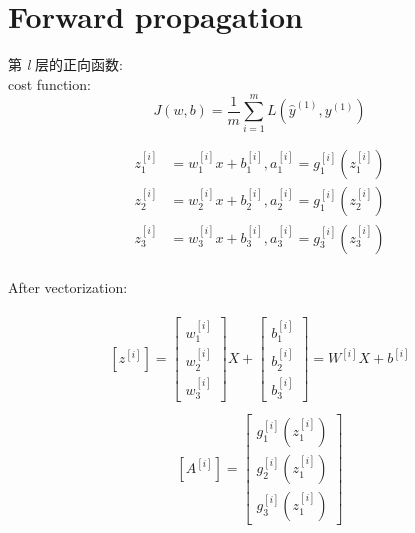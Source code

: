 \documentclass{article}
\begin{document}
\section{Forward propagation} %
\label{sec:forward_propagation}

第 \textit{ l }层的正向函数: \\
	cost function:
	\begin{equation}
	J(w,b) = \frac{1}{m} \sum_{i=1}^m L(\hat{y}^{(1) }, y^{(1)})
	\end{equation}

	\begin{equation}
	\begin{split}
	z_{1}^{[i]} &= w_{1}^{[i]}x + b_{1}^{[i]}  ,  a_{1}^{[i]}   = g_{1}^{[i]}(z_{1}^{[i]}) \\
	z_{2}^{[i]} &= w_{2}^{[i]}x + b_{2}^{[i]}  ,  a_{2}^{[i]}   = g_{1}^{[i]}(z_{2}^{[i]}) \\
	z_{3}^{[i]} &= w_{3}^{[i]}x + b_{3}^{[i]}  ,  a_{3}^{[i]}  = g_{3}^{[i]}(z_{3}^{[i]}) \\
	\end{split}
	\end{equation}

	After vectorization:

	\begin{gather}
	\begin{split}
	[z^{[i]}]
	=
	\left[\begin{array}{c}
		 w_{1}^{[i]}  \\  w_{2}^{[i]}  \\  w_{3}^{[i]}
	\end{array}\right]
	X
	+
	\left[\begin{array}{c}
		 b_{1}^{[i]}  \\  b_{2}^{[i]}  \\  b_{3}^{[i]}
	\end{array}\right]
	=
	W^{[i]}X + b^{[i]}
	\end{split}
	\end{gather}
	\begin{gather}
	\begin{split}
	[A^{[i]}]
	=
	\left[\begin{array}{c}
		 g_{1}^{[i]}(z_{1}^{[i]})  \\ g_{2}^{[i]}(z_{1}^{[i]})  \\  g_{3}^{[i]}(z_{1}^{[i]})
	\end{array}\right]
	\end{split}
	\end{gather}
\end{document}
